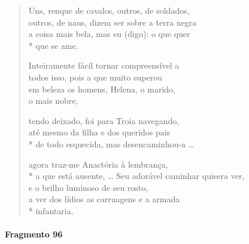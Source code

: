 \begin{verse}
Uns, renque de cavalos, outros, de soldados,\\
outros, de naus, dizem ser sobre a terra negra\\
a coisa mais bela, mas eu (digo): o que quer\\*
que se ame.

Inteiramente fácil tornar compreensível a\\
todos isso, pois a que muito superou\\			\EP[]
em beleza os homens, Helena, o marido, \\
o mais nobre,

tendo deixado, foi para Troia navegando,\\
até mesmo da filha e dos queridos pais\\*
de todo esquecida, mas desencaminhou-a \ldots{}

agora traz-me Anactória à lembrança,\\*
a que está ausente, \ldots{} \medskip
%
Seu adorável caminhar \qb{}quisera ver,\\
e o brilho luminoso de seu rosto,\\
a ver dos lídios as carruagens e a armada\\*
infantaria.
\end{verse}


\paragraph{Fragmento 96}

